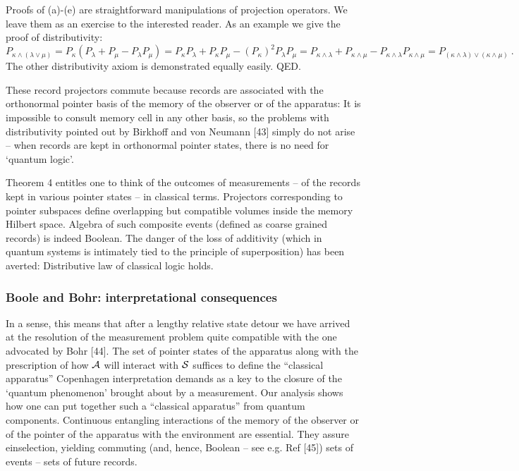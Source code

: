 \documentclass[aps,pra,epsfig,11pt,floatfix]{revtex4}
\begin{document}
Proofs of (a)-(e) are straightforward manipulations of projection operators.
We leave them as an exercise to the interested reader. As an example we give
the proof of distributivity:
$P_{\kappa\wedge(\lambda\vee\mu)} =
P_{\kappa}(P_{\lambda} + P_{\mu} - P_{\lambda} P_{\mu}) =
P_{\kappa}P_{\lambda} + P_{\kappa}P_{\mu} - (P_{\kappa})^2P_{\lambda} P_{\mu}
 = P_{\kappa \wedge \lambda} + P_{\kappa \wedge \mu} - P_{\kappa \wedge 
\lambda} P_{\kappa \wedge \mu} =
P_{(\kappa \wedge \lambda) \vee (\kappa \wedge \mu)} \ . $ 
The other distributivity axiom is demonstrated equally easily. QED.

These record
projectors commute because records are associated with the orthonormal pointer
basis of the memory of the observer or of the apparatus: It is impossible to
consult memory cell in any other basis, so the problems with distributivity
pointed out by Birkhoff and von Neumann [43] simply do not arise -- 
when records
are kept in orthonormal pointer states, there is no need for `quantum logic'.

Theorem 4 entitles one to think of the outcomes of measurements --
of the records kept in various pointer states -- in classical terms.
Projectors corresponding to pointer subspaces define overlapping but
compatible volumes inside the memory Hilbert space. Algebra of such composite
events (defined as coarse grained records) is indeed Boolean. The danger of
the loss of additivity (which in quantum systems is intimately tied to
the principle of superposition) has been averted: Distributive law of
classical logic holds.

\subsubsection{Boole and Bohr: interpretational consequences}

In a sense, this means that after a lengthy relative state detour we have
arrived at the resolution of the measurement problem quite compatible with 
the one advocated by Bohr [44]. The set of pointer states of the apparatus 
along with the prescription of how ${\cal A}$ will interact with ${\cal S}$ suffices
to define the ``classical apparatus'' Copenhagen interpretation demands as
a key to the closure of the `quantum phenomenon' brought about by a 
measurement.
Our analysis shows how one can put together such a ``classical apparatus''
from quantum components. Continuous entangling interactions of the memory of
the observer or of the pointer of the apparatus with the environment
are essential. They assure einselection, yielding commuting (and, hence,
Boolean -- see e.g. Ref [45]) sets of events -- sets of future records.
\end{document}
